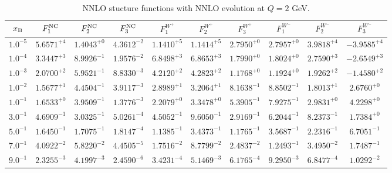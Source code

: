 \begin{table}[h]
\begin{adjustbox}{width=\textwidth}
\begin{tabular}{|c||c|c|c|c|c|c|c|c|c|}
\hline
$x_{\rm B}$ & $F_1^{\rm NC}$ & $F_2^{\rm NC}$ & $F_3^{\rm NC}$ & $F_1^{W^+}$ & $F_2^{W^+}$ & $F_3^{W^+}$ & $F_1^{W^-}$ & $F_2^{W^-}$ & $F_3^{W^-}$ \\
\hline
$ 1.0^{-5}$ & $ 5.6571^{+4}$ & $ 1.4043^{+0}$ & $ 4.3612^{-2}$ & $ 1.1410^{+5}$ & $ 1.1414^{+5}$ & $ 2.7950^{+0}$ & $ 2.7957^{+0}$ & $ 3.9818^{+4}$ & $-3.9585^{+4}$ \\
$ 1.0^{-4}$ & $ 3.3447^{+3}$ & $ 8.9926^{-1}$ & $ 1.9576^{-2}$ & $ 6.8498^{+3}$ & $ 6.8653^{+3}$ & $ 1.7990^{+0}$ & $ 1.8024^{+0}$ & $ 2.7590^{+3}$ & $-2.6549^{+3}$ \\
$ 1.0^{-3}$ & $ 2.0700^{+2}$ & $ 5.9521^{-1}$ & $ 8.8330^{-3}$ & $ 4.2120^{+2}$ & $ 4.2823^{+2}$ & $ 1.1768^{+0}$ & $ 1.1924^{+0}$ & $ 1.9262^{+2}$ & $-1.4580^{+2}$ \\
$ 1.0^{-2}$ & $ 1.5677^{+1}$ & $ 4.4504^{-1}$ & $ 3.9117^{-3}$ & $ 2.8989^{+1}$ & $ 3.2064^{+1}$ & $ 8.1638^{-1}$ & $ 8.8502^{-1}$ & $ 1.8013^{+1}$ & $ 2.6760^{+0}$ \\
$ 1.0^{-1}$ & $ 1.6533^{+0}$ & $ 3.9509^{-1}$ & $ 1.3776^{-3}$ & $ 2.2079^{+0}$ & $ 3.3478^{+0}$ & $ 5.3905^{-1}$ & $ 7.9275^{-1}$ & $ 2.9831^{+0}$ & $ 4.2298^{+0}$ \\
$ 3.0^{-1}$ & $ 4.6909^{-1}$ & $ 3.0325^{-1}$ & $ 5.0261^{-4}$ & $ 4.5052^{-1}$ & $ 9.6050^{-1}$ & $ 2.9169^{-1}$ & $ 6.2044^{-1}$ & $ 8.2373^{-1}$ & $ 1.7384^{+0}$ \\
$ 5.0^{-1}$ & $ 1.6450^{-1}$ & $ 1.7075^{-1}$ & $ 1.8147^{-4}$ & $ 1.1385^{-1}$ & $ 3.4373^{-1}$ & $ 1.1765^{-1}$ & $ 3.5687^{-1}$ & $ 2.2316^{-1}$ & $ 6.7051^{-1}$ \\
$ 7.0^{-1}$ & $ 4.0922^{-2}$ & $ 5.8220^{-2}$ & $ 4.4505^{-5}$ & $ 1.7516^{-2}$ & $ 8.7799^{-2}$ & $ 2.4837^{-2}$ & $ 1.2493^{-1}$ & $ 3.4950^{-2}$ & $ 1.7487^{-1}$ \\
$ 9.0^{-1}$ & $ 2.3255^{-3}$ & $ 4.1997^{-3}$ & $ 2.4590^{-6}$ & $ 3.4231^{-4}$ & $ 5.1469^{-3}$ & $ 6.1765^{-4}$ & $ 9.2950^{-3}$ & $ 6.8477^{-4}$ & $ 1.0292^{-2}$ \\
\hline
\end{tabular}
\end{adjustbox}\caption{NNLO stucture functions with NNLO evolution at $Q = 2$ GeV.}
\label{tab:N2LO-Q2}
\end{table}


